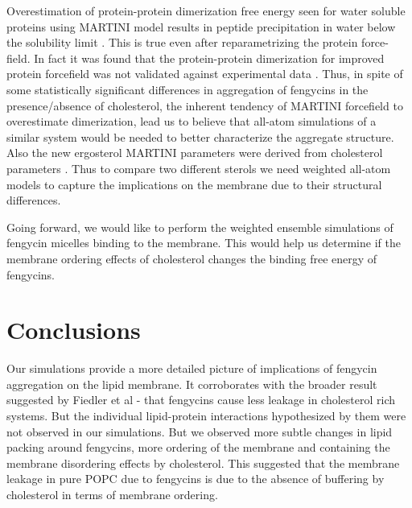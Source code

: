 Overestimation of protein-protein dimerization free energy seen for water soluble proteins 
using MARTINI model results in peptide precipitation in water below the solubility limit 
\cite{Elcock2013}. This is true even after reparametrizing the protein 
force-field\cite{Marrink2013}. In fact it was found that the protein-protein dimerization 
for improved protein forcefield was not validated against experimental data 
\cite{Nishizawa2014}.
Thus, in spite of some statistically significant differences in aggregation of fengycins in 
the presence/absence of cholesterol, the inherent tendency of MARTINI forcefield to 
overestimate dimerization, lead us to believe that all-atom simulations of a similar system 
would be needed to better characterize the aggregate structure.
Also the new ergosterol MARTINI parameters were derived from cholesterol parameters 
\cite{Melo2015}. Thus to compare two different sterols we need weighted all-atom models 
to capture the implications on the membrane due to their structural differences.

Going forward, we would like to perform the weighted ensemble simulations of fengycin micelles binding to the membrane. This would help us determine if the membrane ordering effects of cholesterol changes the binding free energy of fengycins.

\section{Conclusions}
\label{s:conc}
Our simulations provide a more detailed picture of implications of fengycin aggregation 
on the lipid membrane. It corroborates with the broader result suggested by Fiedler et al \-- that fengycins cause less leakage in cholesterol rich systems. But the individual lipid-protein interactions hypothesized by them were not observed in our simulations. 
But we observed more subtle changes in lipid packing around fengycins, more ordering of the membrane and containing the membrane disordering effects by cholesterol.
This suggested that the membrane leakage in pure POPC due to fengycins is due to the absence of buffering by cholesterol in terms of membrane ordering.

